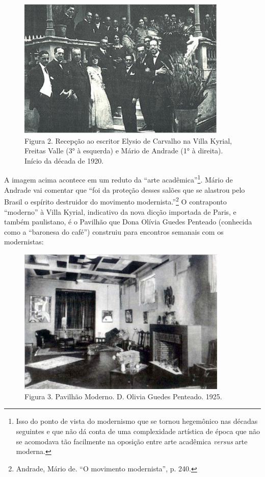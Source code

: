 \pagebreak

\begin{figure}[!ht]
\centering
 \includegraphics[width=100mm]{./imgs/fig2.jpg}
\caption{Figura 2. Recepção ao escritor Elysio de Carvalho na Villa Kyrial,
Freitas Valle (3° à esquerda) e Mário de Andrade (1° à direita). Início
da década de 1920.}
\end{figure}


A imagem acima acontece em um reduto da ``arte acadêmica''\footnote{Isso
  do ponto de vista do modernismo que se tornou hegemônico nas décadas
  seguintes e que não dá conta de uma complexidade artística de época
  que não se acomodava tão facilmente na oposição entre arte acadêmica
  \emph{versus} arte moderna.}. Mário de Andrade vai comentar que ``foi
da proteção desses salões que se alastrou pelo Brasil o espírito
destruidor do movimento modernista.''\footnote{Andrade, Mário de. ``O
  movimento modernista'', p. 240.} O contraponto ``moderno'' à Villa
Kyrial, indicativo da nova dicção importada de Paris, e também
paulistano, é o Pavilhão que Dona Olívia Guedes Penteado (conhecida como
a ``baronesa do café'') construiu para encontros semanais com os
modernistas:

\pagebreak

\begin{figure}[!ht]
\centering
 \includegraphics[width=100mm]{./imgs/fig3.jpg}
\caption{Figura 3. Pavilhão Moderno. D. Olivia Guedes Penteado. 1925.}
\end{figure}


